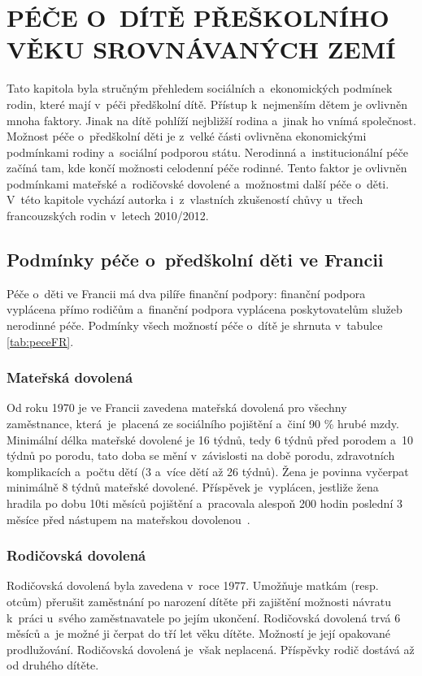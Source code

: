 \chapter{PÉČE O~DÍTĚ PŘEŠKOLNÍHO VĚKU SROVNÁVANÝCH ZEMÍ}

	Tato kapitola byla stručným přehledem sociálních a~ekonomických podmínek rodin, které mají v péči předškolní dítě. Přístup k nejmenším dětem je ovlivněn mnoha faktory. Jinak na dítě pohlíží nejbližší rodina a~jinak ho vnímá společnost. Možnost péče o~předškolní děti je z velké části ovlivněna ekonomickými podmínkami rodiny a~sociální podporou státu. Nerodinná a~institucionální péče začíná tam, kde končí možnosti celodenní péče rodinné. Tento faktor je ovlivněn podmínkami mateřské a~rodičovské dovolené a~možnostmi další péče o~děti. V~této kapitole vychází autorka i~z~vlastních zkušeností chůvy u~třech francouzských rodin v~letech 2010/2012.

		\section{Podmínky péče o~předškolní děti ve Francii}
		Péče o~děti ve Francii má dva pilíře finanční podpory: finanční podpora vyplácena přímo rodičům a~finanční podpora vyplácena poskytovatelům služeb nerodinné péče. Podmínky všech možností péče o~dítě je shrnuta v~tabulce \ref{tab:peceFR}.


			\subsection{Mateřská dovolená}
				Od roku 1970 je ve Francii zavedena mateřská dovolená pro všechny zaměstnance, která je placená ze sociálního pojištění a~činí 90 \% hrubé mzdy. Minimální délka mateřské dovolené je 16 týdnů, tedy 6 týdnů před porodem a~10 týdnů po porodu, tato doba se mění v závislosti na době porodu, zdravotních komplikacích a~počtu dětí (3 a~více dětí až 26 týdnů). Žena je povinna vyčerpat minimálně 8 týdnů mateřské dovolené. Příspěvek je vyplácen, jestliže žena hradila po dobu 10ti měsíců pojištění a~pracovala alespoň 200 hodin poslední 3 měsíce před nástupem na mateřskou dovolenou~\citep{Dennipece}.

			\subsection{Rodičovská dovolená}
				Rodičovská dovolená byla zavedena v roce 1977. Umožňuje matkám (resp. otcům) přerušit zaměstnání po narození dítěte při zajištění možnosti návratu k práci u~svého zaměstnavatele po jejím ukončení. Rodičovská dovolená trvá 6 měsíců a~je možné ji čerpat do tří let věku dítěte. Možností je její opakované prodlužování. Rodičovská dovolená je však neplacená. Příspěvky rodič dostává až od druhého dítěte. 

